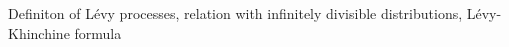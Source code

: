 Definiton of Lévy processes, relation with infinitely divisible distributions, Lévy-Khinchine formula